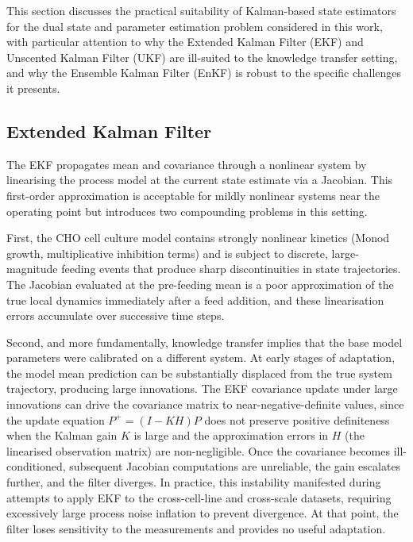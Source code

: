 \label{SI:estimator_comparison}
{\color{blue}
This section discusses the practical suitability of Kalman-based state estimators for the dual state and parameter estimation problem considered in this work, with particular attention to why the Extended Kalman Filter (EKF) and Unscented Kalman Filter (UKF) are ill-suited to the knowledge transfer setting, and why the Ensemble Kalman Filter (EnKF) is robust to the specific challenges it presents.

\subsection*{Extended Kalman Filter}

The EKF propagates mean and covariance through a nonlinear system by linearising the process model at the current state estimate via a Jacobian. This first-order approximation is acceptable for mildly nonlinear systems near the operating point but introduces two compounding problems in this setting.

First, the CHO cell culture model contains strongly nonlinear kinetics (Monod growth, multiplicative inhibition terms) and is subject to discrete, large-magnitude feeding events that produce sharp discontinuities in state trajectories. The Jacobian evaluated at the pre-feeding mean is a poor approximation of the true local dynamics immediately after a feed addition, and these linearisation errors accumulate over successive time steps.

Second, and more fundamentally, knowledge transfer implies that the base model parameters were calibrated on a different system. At early stages of adaptation, the model mean prediction can be substantially displaced from the true system trajectory, producing large innovations. The EKF covariance update under large innovations can drive the covariance matrix to near-negative-definite values, since the update equation $P^{+} = (I - KH)P$ does not preserve positive definiteness when the Kalman gain $K$ is large and the approximation errors in $H$ (the linearised observation matrix) are non-negligible. Once the covariance becomes ill-conditioned, subsequent Jacobian computations are unreliable, the gain escalates further, and the filter diverges. In practice, this instability manifested during attempts to apply EKF to the cross-cell-line and cross-scale datasets, requiring excessively large process noise inflation to prevent divergence. At that point, the filter loses sensitivity to the measurements and provides no useful adaptation.

}
